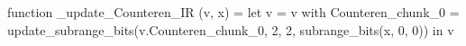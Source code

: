 function _update_Counteren_IR (v, x) = let v = { v with Counteren_chunk_0 = update_subrange_bits(v.Counteren_chunk_0, 2, 2, subrange_bits(x, 0, 0)) } in
  v
